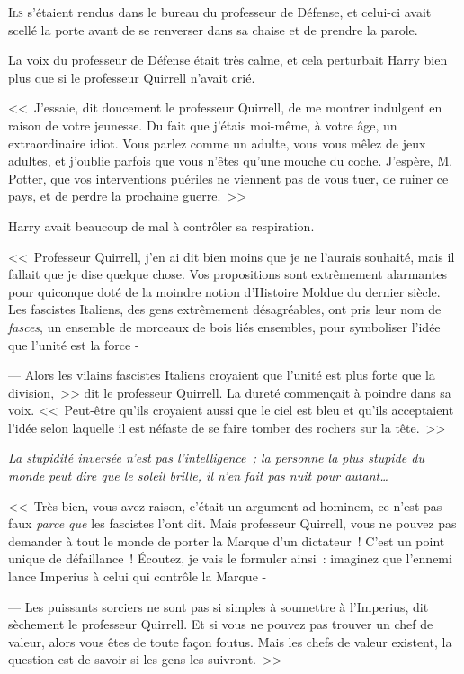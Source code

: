 
\lettrine{I}{ls} s'étaient rendus dans le bureau du professeur de Défense, et celui-ci avait scellé la porte avant de se renverser dans sa chaise et de prendre la parole.

La voix du professeur de Défense était très calme, et cela perturbait Harry bien plus que si le professeur Quirrell n'avait crié.

<<~J'essaie, dit doucement le professeur Quirrell, de me montrer indulgent en raison de votre jeunesse. Du fait que j'étais moi-même, à votre âge, un extraordinaire idiot. Vous parlez comme un adulte, vous vous mêlez de jeux adultes, et j'oublie parfois que vous n'êtes qu'une mouche du coche. J'espère, M. Potter, que vos interventions puériles ne viennent pas de vous tuer, de ruiner ce pays, et de perdre la prochaine guerre.~>>

Harry avait beaucoup de mal à contrôler sa respiration.

<<~Professeur Quirrell, j'en ai dit bien moins que je ne l'aurais souhaité, mais il fallait que je dise quelque chose. Vos propositions sont extrêmement alarmantes pour quiconque doté de la moindre notion d'Histoire Moldue du dernier siècle. Les fascistes Italiens, des gens extrêmement désagréables, ont pris leur nom de \emph{fasces}, un ensemble de morceaux de bois liés ensembles, pour symboliser l'idée que l'unité est la force -

--- Alors les vilains fascistes Italiens croyaient que l'unité est plus forte que la division,~>> dit le professeur Quirrell. La dureté commençait à poindre dans sa voix. <<~Peut-être qu'ils croyaient aussi que le ciel est bleu et qu'ils acceptaient l'idée selon laquelle il est néfaste de se faire tomber des rochers sur la tête.~>>

\emph{La stupidité inversée n'est pas l'intelligence~; la personne la plus stupide du monde peut dire que le soleil brille, il n'en fait pas nuit pour autant…}

<<~Très bien, vous avez raison, c'était un argument ad hominem, ce n'est pas faux \emph{parce que} les fascistes l'ont dit. Mais professeur Quirrell, vous ne pouvez pas demander à tout le monde de porter la Marque d'un dictateur~! C'est un point unique de défaillance~! Écoutez, je vais le formuler ainsi~: imaginez que l'ennemi lance Imperius à celui qui contrôle la Marque -

--- Les puissants sorciers ne sont pas si simples à soumettre à l'Imperius, dit sèchement le professeur Quirrell. Et si vous ne pouvez pas trouver un chef de valeur, alors vous êtes de toute façon foutus. Mais les chefs de valeur existent, la question est de savoir si les gens les suivront.~>>

